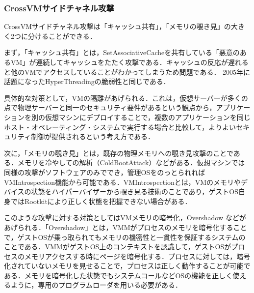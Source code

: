 \subsubsection{CrossVMサイドチャネル攻撃}
CrossVMサイドチャネル攻撃は「キャッシュ共有」，「メモリの覗き見」の大きく2つに分けることができる\cite{vmsec}．\par 
まず，「キャッシュ共有」とは，SetAssociativeCacheを共有している「悪意のあるVM」が連続してキャッシュをたたく攻撃である．キャッシュの反応が遅れると他のVMでアクセスしていることがわかってしまうため問題である．
2005年に話題になったHyperThreadingの脆弱性と同じである．\par
具体的な対策として，VMの隔離があげられる．これは，仮想サーバーが多くの点で物理サーバーと同一のセキュリティ要件があるという観点から，アプリケーションを別の仮想マシンにデプロイすることで，複数のアプリケーションを同じホスト・オペレーティング・システムで実行する場合と比較して，よりよいセキュリティ制御が提供されるという考え方である．\par 
次に，「メモリの覗き見」とは，既存の物理メモリへの覗き見攻撃のことである．メモリを冷やしての解析（ColdBootAttack）などがある．仮想マシンでは同様の攻撃がソフトウェアのみででき，管理OSをのっとられればVMIntrospection機能から可能である．VMIntrospectionとは，VMのメモリやデバイスの状態をハイパーバイザーから覗き見る技術のことであり，ゲストOS自身ではRootkitにより正しく状態を把握できない場合がある．\par
このような攻撃に対する対策としてはVMメモリの暗号化，Overshadow
などがあげられる．「Overshadow」とは，VMMがプロセスのメモリを暗号化することで，ゲストOSが乗っ取られてもメモリの機密性と一貫性を保証するシステムのことである\cite{chen2008}．VMMがゲストOS上のコンテキストを認識して，ゲストOSがプロセスのメモリアクセスする時にページを暗号化する．プロセスに対しては，暗号化されていないメモリを見せることで，プロセスは正しく動作することが可能である．メモリを暗号化した状態でもシステムコールなどOSの機能を正しく使えるように，専用のプログラムローダを用いる必要がある．\par
